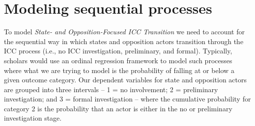 

\section*{Modeling sequential processes}




To model \emph{State- and Opposition-Focused ICC Transition} we need to account for the sequential way in which states and opposition actors transition through the ICC process (i.e., no ICC investigation, preliminary, and formal). Typically, scholars would use an ordinal regression framework to model such processes where what we are trying to model is the probability of falling at or below a given outcome category. Our dependent variables for state and opposition actors are grouped into three intervals -- 1 = no involvement; 2 = preliminary investigation; and 3 = formal investigation -- where the cumulative probability for category 2 is the probability that an actor is either in the no or preliminary investigation stage.


